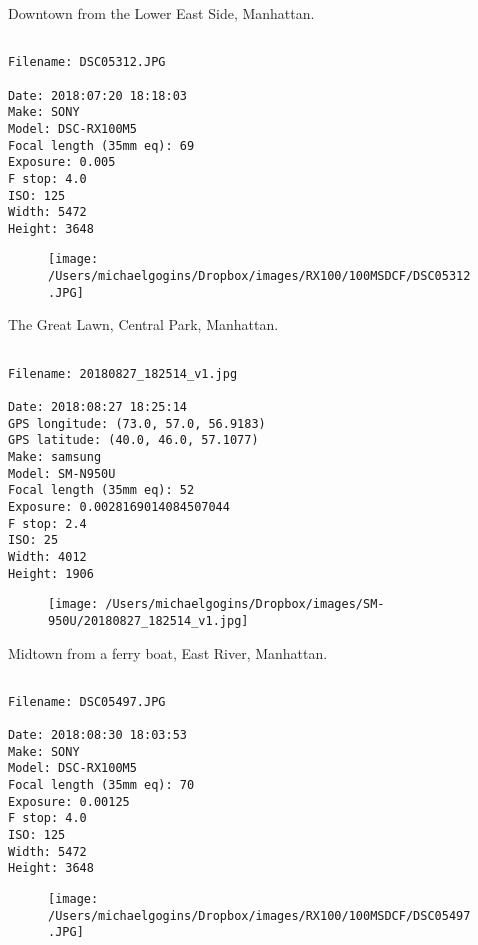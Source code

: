 \clearpage
\onecolumn
\noindent Downtown from the Lower East Side, Manhattan.
\noindent
\begin{lstlisting}

Filename: DSC05312.JPG

Date: 2018:07:20 18:18:03
Make: SONY
Model: DSC-RX100M5
Focal length (35mm eq): 69
Exposure: 0.005
F stop: 4.0
ISO: 125
Width: 5472
Height: 3648
\end{lstlisting}
\clearpage

\begin{figure}
\texttt{[image: /Users/michaelgogins/Dropbox/images/RX100/100MSDCF/DSC05312.JPG]}
\end{figure}
    
\clearpage
\onecolumn
\noindent The Great Lawn, Central Park, Manhattan.
\noindent
\begin{lstlisting}

Filename: 20180827_182514_v1.jpg

Date: 2018:08:27 18:25:14
GPS longitude: (73.0, 57.0, 56.9183)
GPS latitude: (40.0, 46.0, 57.1077)
Make: samsung
Model: SM-N950U
Focal length (35mm eq): 52
Exposure: 0.0028169014084507044
F stop: 2.4
ISO: 25
Width: 4012
Height: 1906
\end{lstlisting}
\clearpage

\begin{figure}
\texttt{[image: /Users/michaelgogins/Dropbox/images/SM-950U/20180827\_182514\_v1.jpg]}
\end{figure}
    
\clearpage
\onecolumn
\noindent Midtown from a ferry boat, East River, Manhattan.
\noindent
\begin{lstlisting}

Filename: DSC05497.JPG

Date: 2018:08:30 18:03:53
Make: SONY
Model: DSC-RX100M5
Focal length (35mm eq): 70
Exposure: 0.00125
F stop: 4.0
ISO: 125
Width: 5472
Height: 3648
\end{lstlisting}
\clearpage

\begin{figure}
\texttt{[image: /Users/michaelgogins/Dropbox/images/RX100/100MSDCF/DSC05497.JPG]}
\end{figure}
    
